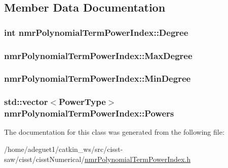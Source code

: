 \subsection{Member Data Documentation}
\hypertarget{classnmr_polynomial_term_power_index_a2794eed1b12205604c2d2d5806279368}{
\subsubsection[{Degree}]{\setlength{\rightskip}{0pt plus 5cm}int nmr\-Polynomial\-Term\-Power\-Index\-::\-Degree\hspace{0.3cm}{\ttfamily [protected]}}}\label{classnmr_polynomial_term_power_index_a2794eed1b12205604c2d2d5806279368}
\hypertarget{classnmr_polynomial_term_power_index_a9b831b9f652cd6053941aff903ddb024}{
\subsubsection[{Max\-Degree}]{ nmr\-Polynomial\-Term\-Power\-Index\-::\-Max\-Degree\hspace{0.3cm}{\ttfamily [protected]}}}\label{classnmr_polynomial_term_power_index_a9b831b9f652cd6053941aff903ddb024}
\hypertarget{classnmr_polynomial_term_power_index_a16ac64643c0802d0efb4bf3f617d0964}{
\subsubsection[{Min\-Degree}]{ nmr\-Polynomial\-Term\-Power\-Index\-::\-Min\-Degree\hspace{0.3cm}{\ttfamily [protected]}}}\label{classnmr_polynomial_term_power_index_a16ac64643c0802d0efb4bf3f617d0964}
\hypertarget{classnmr_polynomial_term_power_index_a05f4d771e733168086d285e1cf0e1d1e}{
\subsubsection[{Powers}]{\setlength{\rightskip}{0pt plus 5cm}std\-::vector$<${\bf Power\-Type}$>$ nmr\-Polynomial\-Term\-Power\-Index\-::\-Powers\hspace{0.3cm}{\ttfamily [protected]}}}\label{classnmr_polynomial_term_power_index_a05f4d771e733168086d285e1cf0e1d1e}


The documentation for this class was generated from the following file\-:\begin{DoxyCompactItemize}
\item 
/home/adeguet1/catkin\-\_\-ws/src/cisst-\/saw/cisst/cisst\-Numerical/\hyperlink{nmr_polynomial_term_power_index_8h}{nmr\-Polynomial\-Term\-Power\-Index.\-h}\end{DoxyCompactItemize}
